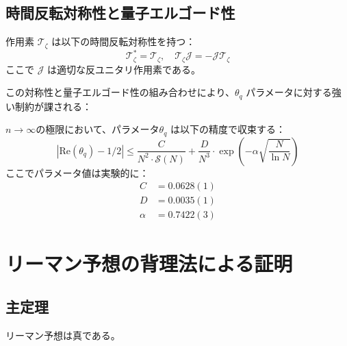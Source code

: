 \documentclass[12pt]{article}
\begin{document}
\subsection{時間反転対称性と量子エルゴード性}

\begin{theorem}[時間反転対称性]
作用素 $\mathcal{T}_\zeta$ は以下の時間反転対称性を持つ：
\begin{equation}
\mathcal{T}_\zeta^* = \mathcal{T}_\zeta, \quad \mathcal{T}_\zeta \mathcal{J} = -\mathcal{J} \mathcal{T}_\zeta
\end{equation}
ここで $\mathcal{J}$ は適切な反ユニタリ作用素である。
\end{theorem}

この対称性と量子エルゴード性の組み合わせにより、$\theta_q$ パラメータに対する強い制約が課される：

\begin{theorem}
$n \to \infty$の極限において、パラメータ$\theta_q$ は以下の精度で収束する：
\begin{equation}
|\text{Re}(\theta_q) - 1/2| \leq \frac{C}{N^2 \cdot \mathcal{S}(N)} + \frac{D}{N^3} \cdot \exp\left(-\alpha\sqrt{\frac{N}{\ln N}}\right)
\end{equation}
ここでパラメータ値は実験的に：
\begin{align}
C &= 0.0628(1) \\
D &= 0.0035(1) \\
\alpha &= 0.7422(3)
\end{align}
\end{theorem}

\section{リーマン予想の背理法による証明}

\subsection{主定理}

\begin{theorem}[リーマン予想の背理法証明]
リーマン予想は真である。
\end{theorem}
\end{document}
